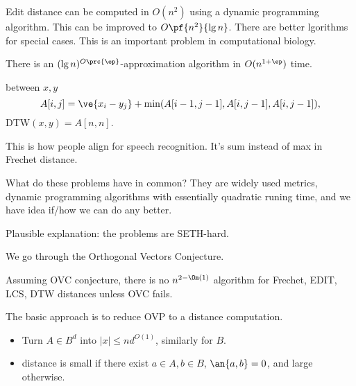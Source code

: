 Edit distance can be computed in $O(n^2)$ using a dynamic programming algorithm. This can be improved to $O\pf{n^2}{\lg n}$. There are better lgorithms for special cases. This is an important problem in computational biology.

There is an $(\lg n)^{O\prc{\ep}}$-approximation algorithm in $O(n^{1+\ep})$ time.
\begin{df}
 between $x,y$
\[
A[i,j]=\ve{x_i-y_j} + \min(A[i-1,j-1],A[i,j-1],A[i,j-1]),
\]
DTW$(x,y)=A[n,n]$.
\end{df}
This is how people align for speech recognition. It's sum instead of max in Frechet distance.

What do these problems have in common? They are widely used metrics, dynamic programming algorithms with essentially quadratic runing time, and we have idea if/how we can do any better. 

Plausible explanation: the problems are SETH-hard.

We go through the Orthogonal Vectors Conjecture. 

\begin{thm}
Assuming OVC conjecture, there is no $n^{2-\Om(1)}$ algorithm for Frechet, EDIT, LCS, DTW distances unless OVC fails.
\end{thm}

The basic approach is to reduce OVP to a distance computation. 
\begin{itemize}
\item
Turn $A\in B^d$ into $|x|\le nd^{O(1)}$, similarly for $B$.
\item distance is small if there exist $a\in A,b\in B$, $\an{a,b}=0$, and large otherwise.
\end{itemize}

